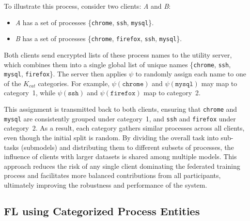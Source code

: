 To illustrate this process, consider two clients: \emph{A} and \emph{B}:
\begin{itemize}[itemsep=0.1em, parsep=0em, topsep=0em, leftmargin=*]
    \item \emph{A} has a set of processes \{\texttt{chrome}, \texttt{ssh}, \texttt{mysql}\}.
    \item \emph{B} has a set of processes \{\texttt{chrome}, \texttt{firefox}, \texttt{ssh}, \texttt{mysql}\}.
\end{itemize}
Both clients send encrypted lists of these process names to the utility server, which combines them into a single global list of unique names \{\texttt{chrome}, \texttt{ssh}, \texttt{mysql}, \texttt{firefox}\}. The server then applies \( \psi \) to randomly assign each name to one of the \( K_{cat} \) categories. For example, \( \psi(\texttt{chrome}) \) and \( \psi(\texttt{mysql}) \) may map to category~1, while \( \psi(\texttt{ssh}) \) and \( \psi(\texttt{firefox}) \) map to category~2.

This assignment is transmitted back to both clients, ensuring that \texttt{chrome} and \texttt{mysql} are consistently grouped under category~1, and \texttt{ssh} and \texttt{firefox} under category~2. As a result, each category gathers similar processes across all clients, even though the initial split is random. By dividing the overall task into sub-tasks (submodels) and distributing them to different subsets of processes, the influence of clients with larger datasets is shared among multiple models. This approach reduces the risk of any single client dominating the federated training process and facilitates more balanced contributions from all participants, ultimately improving the robustness and performance of the system.

\subsection{FL using Categorized Process Entities}
\label{sys:fpgl}




